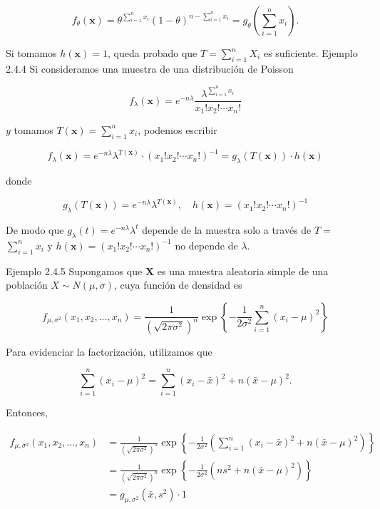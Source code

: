 \documentclass[
]{article}
\begin{document}
\[
f_{\theta}(\mathbf{x})=\theta^{\sum_{i=1}^{n} x_{i}}(1-\theta)^{n-\sum_{i=1}^{n} x_{i}}=g_{\theta}\left(\sum_{i=1}^{n} x_{i}\right) .
\]

Si tomamos \(h(\mathbf{x})=1\), queda probado que \(T=\sum_{i=1}^{n} X_{i}\) es suficiente.
Ejemplo 2.4.4 Si consideramos una muestra de una distribución de Poisson

\[
f_{\lambda}(\mathbf{x})=e^{-n \lambda} \frac{\lambda^{\sum_{i=1}^{n} x_{i}}}{x_{1}!x_{2}!\cdots x_{n}!}
\]

\(y\) tomamos \(T(\mathbf{x})=\sum_{i=1}^{n} x_{i}\), podemos escribir

\[
f_{\lambda}(\mathbf{x})=e^{-n \lambda} \lambda^{T(\mathbf{x})} \cdot\left(x_{1}!x_{2}!\cdots x_{n}!\right)^{-1}=g_{\lambda}(T(\mathbf{x})) \cdot h(\mathbf{x})
\]

donde

\[
g_{\lambda}(T(\mathbf{x}))=e^{-n \lambda} \lambda^{T(\mathbf{x})}, \quad h(\mathbf{x})=\left(x_{1}!x_{2}!\cdots x_{n}!\right)^{-1}
\]

De modo que \(g_{\lambda}(t)=e^{-n \lambda} \lambda^{t}\) depende de la muestra solo a través de \(T=\) \(\sum_{i=1}^{n} x_{i}\) y \(h(\mathbf{x})=\left(x_{1}!x_{2}!\cdots x_{n}!\right)^{-1}\) no depende de \(\lambda\).

Ejemplo 2.4.5 Supongamos que \(\mathbf{X}\) es una muestra aleatoria simple de una población \(X \sim N(\mu, \sigma)\), cuya función de densidad es

\[
f_{\mu, \sigma^{2}}\left(x_{1}, x_{2}, \ldots, x_{n}\right)=\frac{1}{\left(\sqrt{2 \pi \sigma^{2}}\right)^{n}} \exp \left\{-\frac{1}{2 \sigma^{2}} \sum_{i=1}^{n}\left(x_{i}-\mu\right)^{2}\right\}
\]

Para evidenciar la factorización, utilizamos que

\[
\sum_{i=1}^{n}\left(x_{i}-\mu\right)^{2}=\sum_{i=1}^{n}\left(x_{i}-\bar{x}\right)^{2}+n(\bar{x}-\mu)^{2} .
\]

Entonces,

\[
\begin{aligned}
f_{\mu, \sigma^{2}}\left(x_{1}, x_{2}, \ldots, x_{n}\right) & =\frac{1}{\left(\sqrt{2 \pi \sigma^{2}}\right)^{n}} \exp \left\{-\frac{1}{2 \sigma^{2}}\left(\sum_{i=1}^{n}\left(x_{i}-\bar{x}\right)^{2}+n(\bar{x}-\mu)^{2}\right)\right\} \\
& =\frac{1}{\left(\sqrt{2 \pi \sigma^{2}}\right)^{n}} \exp \left\{-\frac{1}{2 \sigma^{2}}\left(n s^{2}+n(\bar{x}-\mu)^{2}\right)\right\} \\
& =g_{\mu, \sigma^{2}}\left(\bar{x}, s^{2}\right) \cdot 1
\end{aligned}
\]
\end{document}
